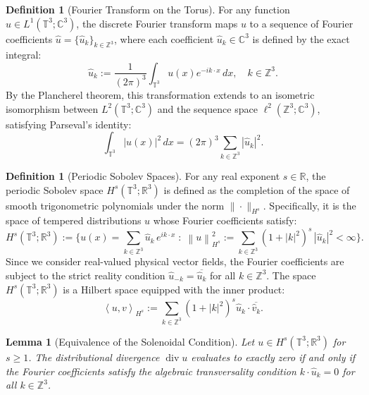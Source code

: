 \documentclass[12pt,a4paper]{article}
\theoremstyle{plain}
\newtheorem{lemma}[theorem]{Lemma}
\theoremstyle{definition}
\newtheorem{definition}[theorem]{Definition}
\theoremstyle{remark}
\newcommand{\T}{\mathbb{T}}
\newcommand{\Z}{\mathbb{Z}}
\newcommand{\R}{\mathbb{R}}
\newcommand{\norm}[1]{\left\|#1\right\|}
\newcommand{\inner}[2]{\left\langle #1, #2 \right\rangle}
\newcommand{\dive}{\operatorname{div}}
\begin{document}
\begin{definition}[Fourier Transform on the Torus]
\label{def:fourier_torus}
For any function $u \in L^1(\T^3; \mathbb{C}^3)$, the discrete Fourier transform maps $u$ to a sequence of Fourier coefficients $\hat{u} = \{\hat{u}_k\}_{k \in \Z^3}$, where each coefficient $\hat{u}_k \in \mathbb{C}^3$ is defined by the exact integral:
\[
  \hat{u}_k := \frac{1}{(2\pi)^3} \int_{\T^3} u(x) e^{-ik \cdot x} \,dx, \quad k \in \Z^3.
\]
By the Plancherel theorem, this transformation extends to an isometric isomorphism between $L^2(\T^3; \mathbb{C}^3)$ and the sequence space $\ell^2(\Z^3; \mathbb{C}^3)$, satisfying Parseval's identity:
\[
  \int_{\T^3} |u(x)|^2 \,dx = (2\pi)^3 \sum_{k \in \Z^3} |\hat{u}_k|^2.
\]
\end{definition}

\begin{definition}[Periodic Sobolev Spaces]
\label{def:sobolev}
For any real exponent $s \in \R$, the periodic Sobolev space $H^s(\T^3; \R^3)$ is defined as the completion of the space of smooth trigonometric polynomials under the norm $\|\cdot\|_{H^s}$. Specifically, it is the space of tempered distributions $u$ whose Fourier coefficients satisfy:
\[
  H^s(\T^3; \R^3)
  :=
  \bigg\{
    u(x) = \sum_{k\in\Z^3} \hat{u}_k\, e^{ik\cdot x}
    \;:\;
    \norm{u}_{H^s}^2
    := \sum_{k\in\Z^3} (1+|k|^2)^s\,|\hat{u}_k|^2 < \infty
  \bigg\}.
\]
Since we consider real-valued physical vector fields, the Fourier coefficients are subject to the strict reality condition $\hat{u}_{-k} = \overline{\hat{u}_k}$ for all $k \in \Z^3$. The space $H^s(\T^3; \R^3)$ is a Hilbert space equipped with the inner product:
\[
  \inner{u}{v}_{H^s} := \sum_{k\in\Z^3} (1+|k|^2)^s \hat{u}_k \cdot \overline{\hat{v}_k}.
\]
\end{definition}

\begin{lemma}[Equivalence of the Solenoidal Condition]
\label{lem:solenoidal_equivalence}
Let $u \in H^s(\T^3; \R^3)$ for $s \ge 1$. The distributional divergence $\dive u$ evaluates to exactly zero if and only if the Fourier coefficients satisfy the algebraic transversality condition $k \cdot \hat{u}_k = 0$ for all $k \in \Z^3$.
\end{lemma}
\end{document}

